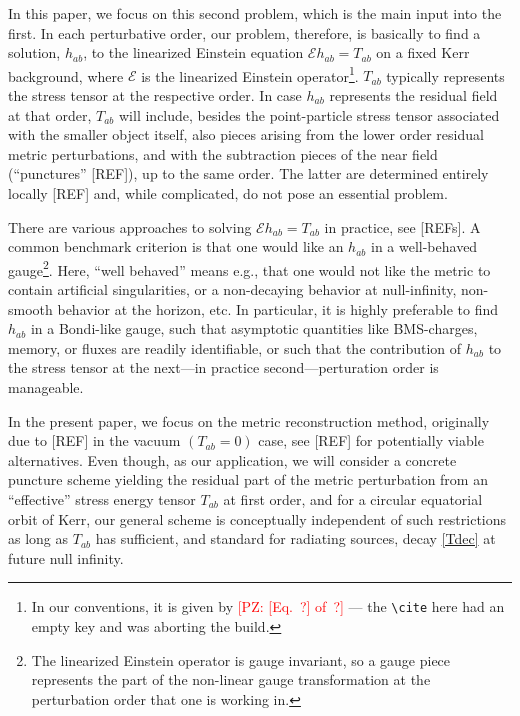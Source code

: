 \documentclass[%
reprint,
 prd,
superscriptaddress,
nofootinbib,
aps,
dvipsnames
]{revtex4-2}
\newcommand{\PZ}[1]{\textcolor{red}{\textsf{[PZ: #1]}}}
\newcommand{\E}{{\mathcal E}}
\begin{document}
In this paper, we focus on this second problem, which is the main input into the first. In each perturbative order, our problem, therefore, is basically to find a solution, $h_{ab}$, to the linearized Einstein equation ${\mathcal E}h_{ab} = T_{ab}$ on a fixed Kerr background, where $\E$ is the linearized Einstein operator\footnote{In our conventions, it is given by \PZ{[Eq.~?] of~?} --- the \texttt{\textbackslash cite} here had an empty key and was aborting the build.}. $T_{ab}$ typically represents the stress tensor at the respective order. In case $h_{ab}$ represents the residual field at that order, $T_{ab}$ will include, besides the point-particle stress tensor associated with the smaller object itself, also pieces arising from the lower order residual metric perturbations, and with the subtraction pieces of the near field (``punctures'' [REF]), up to the same order. The latter are determined entirely locally [REF] and, while complicated, do not pose an essential problem. 

There are various approaches to solving $\E h_{ab} = T_{ab}$ in practice, see [REFs]. A common benchmark criterion is that one would like an $h_{ab}$ in a well-behaved gauge\footnote{The linearized Einstein operator is gauge invariant, so a gauge piece represents the part of the non-linear gauge transformation at the perturbation order that one is working in.}. Here, ``well behaved'' means e.g., that one would not like the metric to contain artificial singularities, or a non-decaying behavior at null-infinity, non-smooth behavior at the horizon, etc. In particular, it is highly preferable to find $h_{ab}$ in a Bondi-like gauge, such that asymptotic quantities like BMS-charges, memory, or fluxes are readily identifiable, or such that the contribution of $h_{ab}$ to the stress tensor at the next---in practice second---perturation order is manageable.

In the present paper, we focus on the metric reconstruction method, originally due to [REF] in the vacuum $(T_{ab}=0)$ case, see [REF] for potentially viable alternatives. Even though, as our application, we will consider a concrete puncture scheme yielding the residual part of the metric perturbation from an ``effective'' stress energy tensor $T_{ab}$ at first order, and for a circular equatorial orbit of Kerr, our general scheme is conceptually independent of such restrictions as long as $T_{ab}$ has sufficient, and standard for radiating sources, decay \eqref{Tdec} at future null infinity. 
\end{document}
